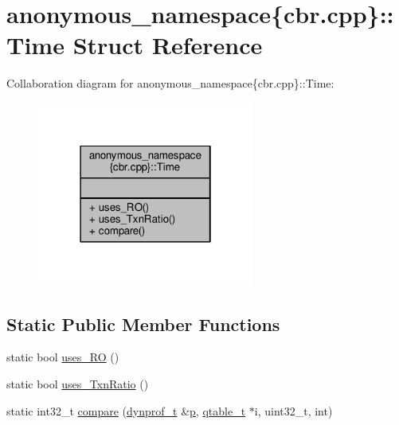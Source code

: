 \hypertarget{structanonymous__namespace_02cbr_8cpp_03_1_1Time}{\section{anonymous\-\_\-namespace\{cbr.\-cpp\}\-:\-:Time Struct Reference}
\label{structanonymous__namespace_02cbr_8cpp_03_1_1Time}
}


Collaboration diagram for anonymous\-\_\-namespace\{cbr.\-cpp\}\-:\-:Time\-:
\nopagebreak
\begin{figure}[H]
\begin{center}
\leavevmode
\includegraphics[width=202pt]{structanonymous__namespace_02cbr_8cpp_03_1_1Time__coll__graph}
\end{center}
\end{figure}
\subsection*{Static Public Member Functions}
\begin{DoxyCompactItemize}
\item 
static bool \hyperlink{structanonymous__namespace_02cbr_8cpp_03_1_1Time_aa125862d9bbcf8659837373bf0d3228b}{uses\-\_\-\-R\-O} ()
\item 
static bool \hyperlink{structanonymous__namespace_02cbr_8cpp_03_1_1Time_ae12b2943fbf81836f55f13da617fef9a}{uses\-\_\-\-Txn\-Ratio} ()
\item 
static int32\-\_\-t \hyperlink{structanonymous__namespace_02cbr_8cpp_03_1_1Time_a8ce4ccdcdab09de781cc55e581da51cc}{compare} (\hyperlink{structstm_1_1dynprof__t}{dynprof\-\_\-t} \&\hyperlink{counted__ptr_8hpp_a5c9f59d7c24e3fd6ceae319a968fc3e0}{p}, \hyperlink{structstm_1_1qtable__t}{qtable\-\_\-t} $\ast$i, uint32\-\_\-t, int)
\end{DoxyCompactItemize}


